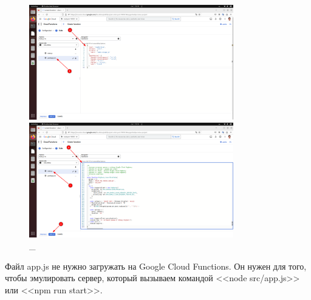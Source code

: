 \documentclass[12pt, a4paper, simple]{eskdtext}
\begin{document}
  \begin{figure}[!h]
    \centering
  
    \begin{minipage}{0.49\textwidth}
      \centering
  
      \includegraphics[height=5cm]
      {images/GoogleCloudFunctions/2023-03-02_04-50-11.png}
  
      \caption{\_}
  
      \label{fig:29}
    \end{minipage}
    \begin{minipage}{0.49\textwidth}
      \centering
  
      \includegraphics[height=5cm]
      {images/GoogleCloudFunctions/2023-03-02_04-51-27.png}
  
      \caption{\_}
  
      \label{fig:30}
    \end{minipage}
  \end{figure}


  

  \newpage

  

  Файл app.js не нужно загружать на Google Cloud Functions. Он нужен для того, чтобы эмулировать сервер,
  который вызываем командой <<node src/app.js>> или <<npm run start>>.
\end{document}
